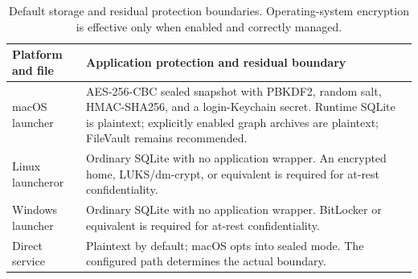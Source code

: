 \begin{table}[t]
\centering
\caption{Default storage and residual protection boundaries. Operating-system encryption is effective only when enabled and correctly managed.}
\label{tab:platform-encryption}
\footnotesize
\begin{tabularx}{\columnwidth}{@{}>{\raggedright\arraybackslash}p{}Y@{}}
\toprule
Platform and file & Application protection and residual boundary \\
\midrule
macOS launcher\newline{}\newline{}\newline{}\newline{} & AES-256-CBC sealed snapshot with PBKDF2, random salt, HMAC-SHA256, and a login-Keychain secret. Runtime SQLite is plaintext; explicitly enabled graph archives are plaintext; FileVault remains recommended. \\
Linux launcher\newline{}\newline{}\newline{}\newline or \newline{}\newline{} & Ordinary SQLite with no application wrapper. An encrypted home, LUKS/dm-crypt, or equivalent is required for at-rest confidentiality. \\
Windows launcher\newline{}\newline{}\newline{} & Ordinary SQLite with no application wrapper. BitLocker or equivalent is required for at-rest confidentiality. \\
Direct service\newline{}\newline{} & Plaintext by default; macOS  opts into sealed mode. The configured path determines the actual boundary. \\
\bottomrule
\end{tabularx}
\end{table}
